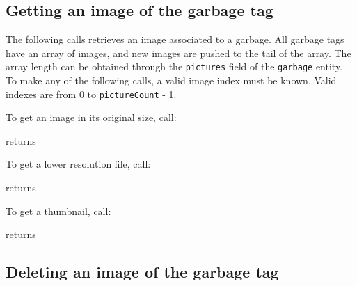 \subsection{Getting an image of the garbage tag}

The following  calls retrieves an image associated to a garbage. All garbage
tags have an array of images, and new images are pushed to the tail of the
array. The array length can be obtained through the \texttt{pictures} field of
the \texttt{garbage} entity.  To make any of the following calls, a valid image
index must be known. Valid indexes are from 0 to \texttt{pictureCount} - 1.

To get an image in its original size, call:

\begin{apidata}{returns}
  \begin{datalist}
  \end{datalist}
\end{apidata}

To get a lower resolution file, call:

\begin{apidata}{returns}
  \begin{datalist}
  \end{datalist}
\end{apidata}

To get a thumbnail, call:

\begin{apidata}{returns}
  \begin{datalist}
  \end{datalist}
\end{apidata}


\subsection{Deleting an image of the garbage tag}

